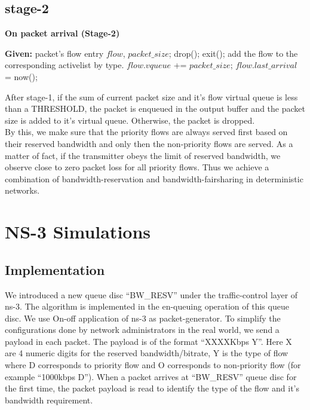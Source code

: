 \documentclass[conference]{IEEEtran}
\begin{document}
\subsection {stage-2}

\begin{algorithm}
\caption{\textbf{On packet arrival (Stage-2)}}
\label {algo:stage2}
\begin{algorithmic}[1]
\STATE \textbf{Given:} packet's flow entry $flow$, $packet\_size$;
\STATE drop();
\STATE exit();
\ELSE
{}
\STATE add the flow to the corresponding activelist by type.
\ENDIF
\STATE $flow.vqueue$ += $packet\_size$;
\STATE $flow.last\_arrival$ = now();
\ENDIF
\end{algorithmic}
\end{algorithm}


After stage-1, if the sum of current packet size and it's flow virtual queue is less than a THRESHOLD, the packet is enqueued in the output buffer and the packet size is added to it's virtual queue. Otherwise, the packet is dropped.
\\

By this, we make sure that the priority flows are always served first based on their reserved bandwidth and only then the non-priority flows are served. As a matter of fact, if the transmitter obeys the limit of reserved bandwidth, we observe close to zero packet loss for all priority flows. Thus we achieve a combination of bandwidth-reservation and bandwidth-fairsharing in deterministic networks.



\section{NS-3 Simulations}

\subsection{Implementation}
We introduced a new queue disc ``BW\_RESV'' under the traffic-control layer of ns-3. The algorithm is implemented in the en-queuing operation of this queue disc. We use On-off application of ns-3 as packet-generator. To simplify the configurations done by network administrators in the real world, we send a payload in each packet. The payload is of the format ``XXXXKbps Y''. Here X are 4 numeric digits for the reserved bandwidth/bitrate, Y is the type of flow where D corresponds to priority flow and O corresponds to non-priority flow (for example ``1000kbps D''). When a packet arrives at ``BW\_RESV'' queue disc for the first time, the packet payload is read to identify the type of the flow and it's bandwidth requirement. 
\end{document}
